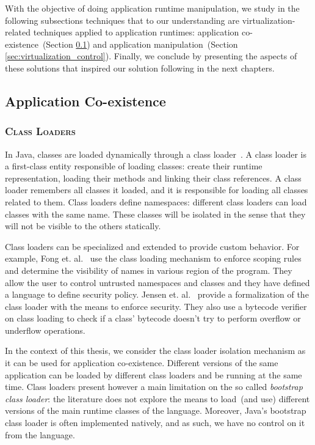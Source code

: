 With the objective of doing application runtime manipulation, we study in the following subsections techniques that to our understanding are virtualization-related techniques applied to application runtimes: application co-existence~(Section \ref{sec:virtualization_coexistence}) and application manipulation~(Section \ref{sec:virtualization_control}). Finally, we conclude by presenting the aspects of these solutions that inspired our solution following in the next chapters.%

\subsection{Application Co-existence}\label{sec:virtualization_coexistence}

\subsubsection*{\textsc{Class Loaders}}
In Java, classes are loaded dynamically through a class loader~\cite{Lian98a}. A class loader is a first-class entity responsible of loading classes: create their runtime representation, loading their methods and linking their class references. A class loader remembers all classes it loaded, and it is responsible for loading all classes related to  them. Class loaders define namespaces: different class loaders can load classes with the same name. These classes will be isolated in the sense that they will not be visible to the others statically.

Class loaders can be specialized and extended to provide custom behavior. For example, Fong et. al.~\cite{Fong10a} use the class loading mechanism to enforce scoping rules and determine the visibility of names in various region of the program. They allow the user to control untrusted
namespaces and classes and they have defined a language to define security policy. Jensen et. al.~\cite{Jens98a} provide a formalization of the class loader with the means to enforce security. They also use a bytecode verifier on class loading to check if a class' bytecode doesn't try to perform overflow or underflow operations.

In the context of this thesis, we consider the class loader isolation mechanism as it can be used for application co-existence. Different versions of the same application can be loaded by different class loaders and be running at the same time. Class loaders present however a main limitation on the so called \emph{bootstrap class loader}: the literature does not explore the means to load~(and use) different versions of the main runtime classes of the language. Moreover, Java's bootstrap class loader is often implemented natively, and as such, we have no control on it from the language.

